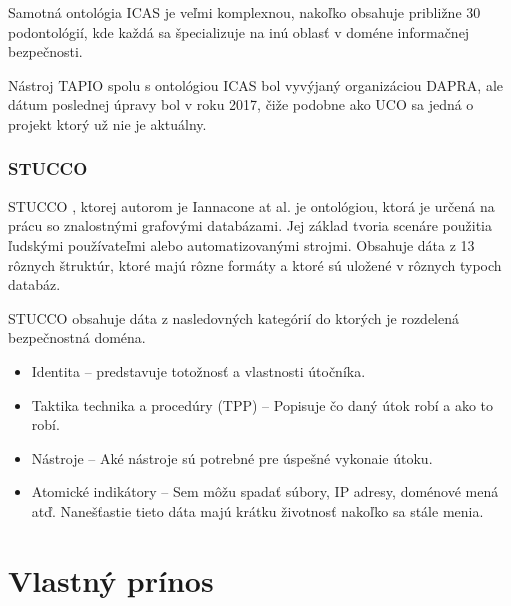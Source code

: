 \documentclass[12pt, a4paper, oneside]{book}
\begin{document}
Samotná ontológia ICAS je veľmi komplexnou, nakoľko obsahuje približne 30 podontológií, kde každá sa špecializuje na inú oblasť v doméne informačnej bezpečnosti.


Nástroj TAPIO spolu s ontológiou ICAS bol vyvýjaný organizáciou DAPRA, ale dátum poslednej úpravy bol v roku 2017, čiže podobne ako UCO sa jedná o projekt ktorý už nie je aktuálny.


\section{STUCCO}
STUCCO \citep{stucco}, ktorej autorom je Iannacone at al. je ontológiou, ktorá je určená na prácu so znalostnými grafovými databázami. Jej základ tvoria scenáre použitia ľudskými používateľmi alebo automatizovanými strojmi. Obsahuje dáta z 13 rôznych štruktúr, ktoré majú rôzne formáty a ktoré sú uložené v rôznych typoch databáz. 


STUCCO obsahuje dáta z nasledovných kategórií do ktorých je rozdelená bezpečnostná doména. 
\begin{itemize}
\item Identita -- predstavuje totožnosť a vlastnosti útočníka.
\item Taktika technika a procedúry (TPP) -- Popisuje čo daný útok robí a ako to robí.
\item Nástroje -- Aké nástroje sú potrebné pre úspešné vykonaie útoku.
\item Atomické indikátory -- Sem môžu spadať súbory, IP adresy, doménové mená atď. Nanešťastie tieto dáta majú krátku životnosť nakoľko sa stále menia.
\end{itemize}


\part{Vlastný prínos}
\end{document}
